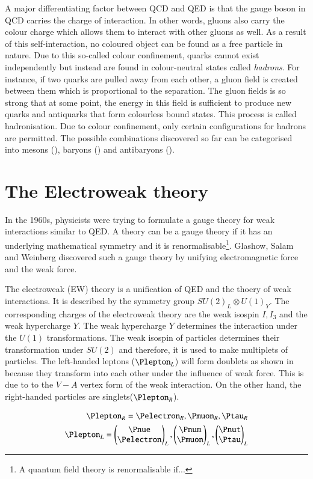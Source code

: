 A major differentiating factor between QCD and QED is that the gauge boson in QCD carries the charge of 
interaction. In other words, gluons also carry the colour charge which allows them to interact with other 
gluons as well. As a result of this self-interaction, no coloured object can be found as a free particle in 
nature. Due to this so-called colour confinement, quarks cannot exist independently but instead are found in
colour-neutral states called \textit{hadrons}. For instance, if two quarks are pulled away from each other, a gluon field is 
created between them which is proportional to the separation. The gluon fields is so strong that at some point,
the energy in this field is sufficient to produce new quarks and antiquarks that form colourless bound states.
This process is called hadronisation. Due to colour confinement, only certain configurations for hadrons
are permitted. The possible combinations discovered so far can be categorised into mesons (\Pquark\APquark),
baryons (\Pquark\Pquark\Pquark) and antibaryons (\APquark\APquark\APquark).


\section{The Electroweak theory}
In the 1960s, physicists were trying to formulate a gauge theory for weak interactions
similar to QED. A theory can be a gauge theory if it has an underlying mathematical symmetry
and it is renormalisable\footnote{A quantum field theory is renormalisable if...}. Glashow,
Salam and Weinberg discovered such a gauge theory by unifying electromagnetic force and 
the weak force.

The electroweak (EW) theory is a unification of QED and the thoery of weak interactions. 
It is described by the symmetry group $SU(2)_L \otimes U(1)_Y$. The corresponding
charges of the electroweak theory are the weak isospin $I,I_3$ and the weak hypercharge $Y$.
The weak hypercharge $Y$ determines the interaction under the $U(1)$ transformations.
The weak isospin of particles determines their transformation under $SU(2)$ and therefore, it is
used to make multiplets of particles. The left-handed leptons ($\Plepton_L$) will form doublets
as shown in  because they transform into each other under the influence of weak force. 
This is due to to the $V-A$ vertex form of the weak interaction. On the other hand, the right-handed 
particles are singlets($\Plepton_R$). 

\begin{align*}
    \Plepton_R = \Pelectron_R, \Pmuon_R, \Ptau_R \\
    \Plepton_L = \begin{pmatrix} \Pnue \\ \Pelectron \end{pmatrix}_L , \begin{pmatrix} \Pnum \\ \Pmuon \end{pmatrix}_L , \begin{pmatrix} \Pnut \\ \Ptau \end{pmatrix}_L 
\end{align*}

